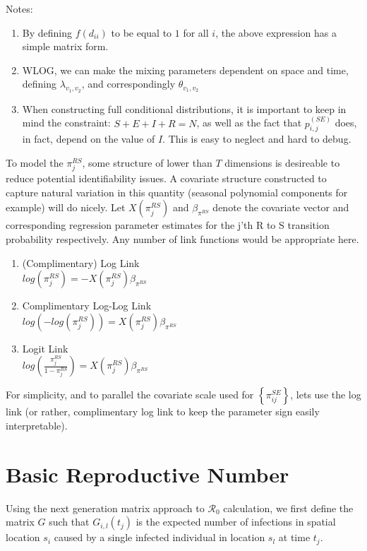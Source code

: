 \documentclass[12pt]{article}
\begin{document}
Notes: 
\begin{enumerate}
    \item By defining $f(d_{ii})$ to be equal to $1$ for all $i$, the above expression has a simple 
        matrix form. 
    \item WLOG, we can make the mixing parameters dependent on space and time, defining $\lambda_{v_1, v_2}$,
        and correspondingly $\theta_{v_1,v_2}$
    \item When constructing full conditional distributions, it is important to keep in mind the constraint:
        $S+E+I+R=N$, as well as the fact that $p_{i,j}^{(SE)}$ does, in fact, depend on the value of $I$.
        This is easy to neglect and hard to debug. 

\end{enumerate}
To model the $\pi_j^{RS}$, some structure of lower than $T$ dimensions is desireable to reduce potential 
identifiability issues. A covariate structure constructed to capture natural variation in this quantity 
(seasonal polynomial components for example) will do nicely. Let $X(\pi_j^{RS})$ and $\beta_{\pi^{RS}}$ 
denote the covariate vector and corresponding regression parameter estimates 
for the j'th R to S transition probability respectively. Any number of link functions would be appropriate here.
 
\begin{enumerate}
    \item (Complimentary) Log Link \\
    $log(\pi_j^{RS}) = -X(\pi_j^{RS}) \beta_{\pi^{RS}}$
    \item Complimentary Log-Log Link \\
    $log(-log(\pi_j^{RS})) = X(\pi_j^{RS}) \beta_{\pi^{RS}}$
    \item Logit Link \\
    $log(\frac{\pi_j^{RS}}{1-\pi_j^{RS}}) = X(\pi_j^{RS}) \beta_{\pi^{RS}}$
\end{enumerate}

For simplicity, and to parallel the covariate scale used for $\left\{\pi_{ij}^{SE} \right\}$, lets 
use the log link (or rather, complimentary log link to keep the parameter sign easily interpretable).

\section{Basic Reproductive Number}

Using the next generation matrix approach to $\mathcal{R}_0$ calculation, we first define the matrix $G$ such 
that $G_{i,l}(t_j)$ is the expected number of infections in spatial location $s_i$ caused by a single infected
individual in location $s_l$ at time $t_j$.
\end{document}
